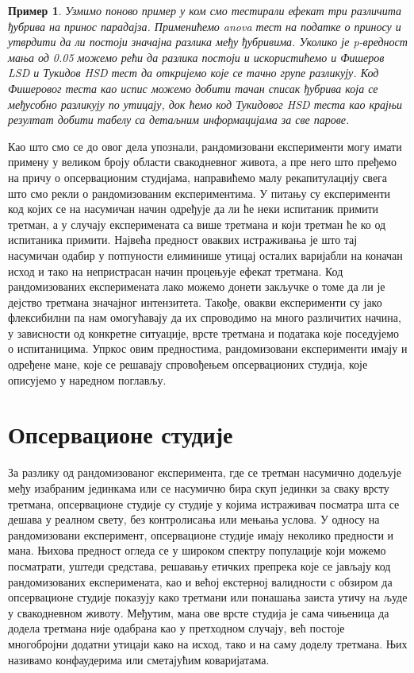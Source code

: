 \documentclass[12pt, a4paper]{article}
\newtheorem{primer}{Пример}[section]
\begin{document}
\begin{primer}
Узмимо поново пример у ком смо тестирали ефекат три различита ђубрива на принос парадајза. Применићемо 
anova тест на податке о приносу и утврдити да ли постоји значајна разлика међу ђубривима. Уколико 
је p-вредност мања од 0.05 можемо рећи да разлика постоји и искористићемо и Фишеров LSD и Тукидов 
HSD тест да откријемо које се тачно групе разликују. Код Фишеровог теста као испис можемо добити 
тачан списак ђубрива која се међусобно разликују по утицају, док ћемо код Тукидовог HSD теста као 
крајњи резултат добити табелу са детаљним информацијама за све парове.
\end{primer}

Као што смо се до овог дела упознали, рандомизовани експерименти могу имати примену у великом 
броју области свакодневног живота, а пре него што пређемо на причу о опсервационим студијама, 
направићемо малу рекапитулацију свега што смо рекли о рандомизованим експериментима.
У питању су експерименти код којих се на насумичан начин одређује да ли ће неки испитаник примити 
третман, а у случају експеримената са више третмана и који третман ће ко од испитаника примити.
Највећа предност оваквих истраживања је што тај насумичан одабир у потпуности елиминише утицај 
осталих варијабли на коначан исход и тако на непристрасан начин процењује ефекат третмана.
Код рандомизованих експеримената лако можемо донети закључке о томе да ли је дејство третмана 
значајног интензитета. Такође, овакви експерименти су јако флексибилни па нам омогућавају да их спроводимо на много 
различитих начина, у зависности од конкретне ситуације, врсте третмана и података које поседујемо 
о испитаницима. Упркос овим предностима, рандомизовани експерименти имају и одређене мане, које се решавају спровођењем опсервационих студија, које описујемо у наредном поглављу.


\section{Опсервационе студије}

За разлику од рандомизованог експеримента, где се третман насумично додељује међу изабраним јединкама или се насумично бира скуп јединки за сваку врсту третмана, опсервационе студије су студије у којима истраживач посматра шта се дешава у реалном свету, без контролисања или мењања услова. У односу на рандомизовани експеримент, опсервационе студије имају неколико предности и мана. Њихова предност огледа се у широком спектру популације који можемо посматрати, уштеди средстава, решавању етичких препрека које се јављају код рандомизованих експеримената, као и већој екстерној валидности с обзиром да опсервационе студије показују како третмани или понашања заиста утичу на људе у свакодневном животу. Међутим, мана ове врсте студија је сама чињеница да додела третмана није одабрана као у претходном случају, већ постоје многобројни додатни утицаји како на исход, тако и на саму доделу третмана. Њих називамо конфаудерима или сметајућим коваријатама. 
\end{document}
